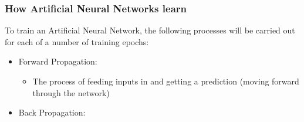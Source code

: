 \documentclass[./project-report/src/latex/project-report.tex]{subfiles}
\begin{document}
\subsubsection{How Artificial Neural Networks learn}
\vspace{5mm}

To train an Artificial Neural Network, the following processes will be carried out for each of a number of training epochs:

\begin{itemize}
    \item Forward Propagation:

    \begin{itemize}
        \item The process of feeding inputs in and getting a prediction (moving forward through the network)
    \end{itemize}

    \item Back Propagation:


\end{itemize}
\end{document}
